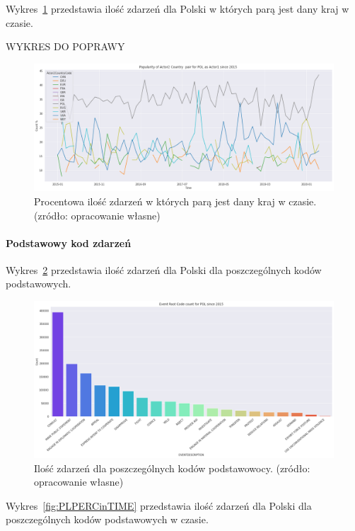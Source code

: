\documentclass[11pt]{report}
\begin{document}
    Wykres~\ref{fig:PLpairPerc} przedstawia ilość zdarzeń dla Polski w których parą jest dany kraj w czasie.

    WYKRES DO POPRAWY
    \begin{figure}[ht]
        \centering
        \includegraphics[width=1 \textwidth]{fig/PL/PLactor2PairPercinTIME.png}
        \caption{Procentowa ilość zdarzeń w których parą jest dany kraj w czasie. (zródło: opracowanie własne)}
        \label{fig:PLpairPerc}
    \end{figure}

    \paragraph{Podstawowy kod zdarzeń}

    Wykres~\ref{fig:PLPERC} przedstawia ilość zdarzeń dla Polski dla poszczególnych kodów podstawowych.


    \begin{figure}[ht]
        \centering
        \includegraphics[width=1 \textwidth]{fig/PL/PLERC.png}
        \caption{Ilość zdarzeń dla poszczególnych kodów podstawowocy. (zródło: opracowanie własne)}
        \label{fig:PLPERC}
    \end{figure}

    Wykres~\ref{fig:PLPERCinTIME} przedstawia ilość zdarzeń dla Polski dla poszczególnych kodów podstawowych w czasie.
\end{document}
